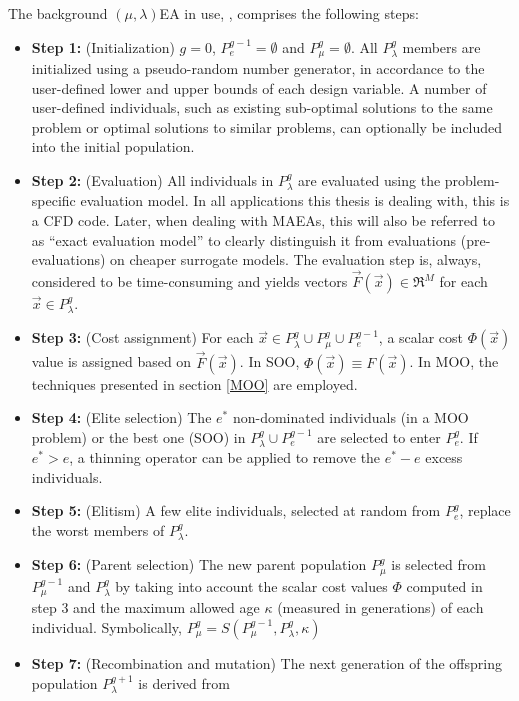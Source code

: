 The background $(\mu,\lambda)$EA in use, \cite{phd_Giotis}, comprises the following steps:
\begin{itemize}
\item[]{\bf Step 1:}  (Initialization) $g=0$, $P_{e}^{g-1}= \emptyset$ and $P_{\mu}^g= \emptyset$. All $P_{\lambda}^g$  members are initialized using a pseudo-random number generator, in accordance to the user-defined lower and upper bounds of each design variable. A number of user-defined individuals, such as existing sub-optimal solutions to the same problem or optimal solutions to similar problems, can optionally be included into the initial population. 
\item[]{\bf Step 2:}  (Evaluation) All individuals in $P_{\lambda}^g$ are evaluated using the problem-specific evaluation model. In all applications this thesis is dealing with, this is a CFD code. Later, when dealing with MAEAs, this will also be referred to as ``exact evaluation model'' to clearly distinguish it from evaluations (pre-evaluations) on cheaper surrogate models. The evaluation step is, always, considered to be time-consuming and yields vectors $\vec{F}(\vec{x}) \in \Re^{M} $ for each $\vec{x} \in P_{\lambda}^g$.
\item[]{\bf Step 3:}  (Cost assignment) For each $\vec{x} \in P_{\lambda}^g \cup P_{\mu}^g \cup P_{e}^{g-1}$, a scalar cost $\Phi(\vec{x})$ value is assigned based on $\vec{F}(\vec{x})$. In SOO, $\Phi(\vec{x}) \equiv F(\vec{x})$. In MOO, the techniques presented in section \ref{MOO} are employed. 
\item[]{\bf Step 4:}  (Elite selection) The $e^*$ non-dominated individuals (in a MOO problem) or the best one (SOO) in $P_{\lambda}^g \cup P_{e}^{g-1}$ are selected to enter $P_e^g$. If $e^*\!>\!e$, a thinning operator \cite{phd_Giotis} can be applied to remove the  $e^*\!-\!e$ excess individuals.     
\item[]{\bf Step 5:}  (Elitism) A few elite individuals, selected at random from $P_e^g$, replace the worst members of $P_{\lambda}^g$.  
\item[]{\bf Step 6:}  (Parent selection) The new parent population $P_{\mu}^{g}$ is selected from $P_{\mu}^{g-1}$ and $P_{\lambda}^g$ by taking into account the scalar cost values $\Phi$ computed in step 3 and the maximum allowed age  $\kappa$ (measured in generations) of each individual. Symbolically, $P_{\mu}^{g}=S(P_{\mu}^{g-1},P_{\lambda}^g,\kappa)$ 
\item[]{\bf Step 7:}  (Recombination and mutation) The next generation of the offspring population $P_{\lambda}^{g+1}$ is derived from 

\end{itemize}
